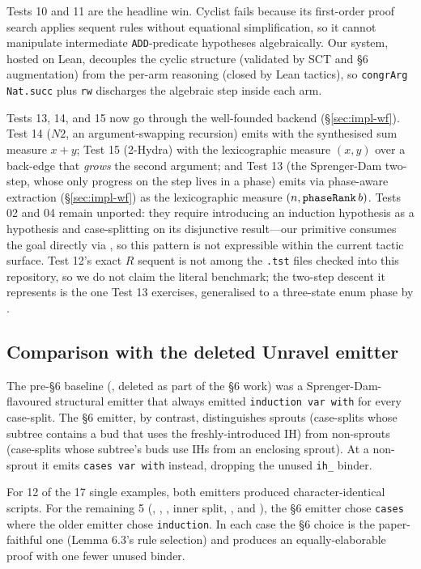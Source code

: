 Tests 10 and 11 are the headline win. Cyclist fails because its first-order
proof search applies sequent rules without equational simplification, so it
cannot manipulate intermediate \texttt{ADD}-predicate hypotheses
algebraically. Our system, hosted on Lean, decouples the cyclic structure
(validated by SCT and §6 augmentation) from the per-arm
reasoning (closed by Lean tactics), so \texttt{congrArg Nat.succ} plus
\texttt{rw} discharges the algebraic step inside each arm.

Tests 13, 14, and 15 now go through the well-founded backend
(§\ref{sec:impl-wf}). Test 14 (\(N2\), an argument-swapping recursion) emits
with the synthesised sum measure \(x+y\); Test 15 (2-Hydra) with the
lexicographic measure \((x,y)\) over a back-edge that \emph{grows} the second
argument; and Test 13 (the Sprenger-Dam two-step, whose only progress on the
 step lives in a  phase) emits via phase-aware extraction
(§\ref{sec:impl-wf}) as the lexicographic measure \((n, \texttt{phaseRank}\,b)\).
Tests 02 and 04 remain unported: they require introducing an induction
hypothesis as a hypothesis and case-splitting on its disjunctive result---our
 primitive consumes the goal directly via , so this
pattern is not expressible within the current tactic surface. Test 12's exact
\(R\) sequent is not among the \texttt{.tst} files checked into this
repository, so we do not claim the literal benchmark; the two-step descent it
represents is the one Test 13 exercises, generalised to a three-state enum
phase by .

\subsection{Comparison with the deleted Unravel emitter}

The pre-§6 baseline (, deleted as part of the §6
work) was a Sprenger-Dam-flavoured structural emitter that always emitted
\texttt{induction var with} for every case-split. The §6 emitter, by
contrast, distinguishes sprouts (case-splits whose subtree contains a bud
that uses the freshly-introduced IH) from non-sprouts (case-splits whose
subtree's buds use IHs from an enclosing sprout). At a non-sprout it
emits \texttt{cases var with} instead, dropping the unused
\texttt{ih\_} binder.

For 12 of the 17 single  examples, both emitters produced
character-identical scripts. For the remaining 5 (,
, ,  inner split,
, and ), the §6 emitter chose \texttt{cases}
where the older emitter chose \texttt{induction}. In each case the §6 choice
is the paper-faithful one (Lemma 6.3's rule selection) and produces an
equally-elaborable proof with one fewer unused binder.

